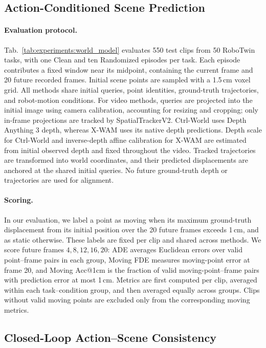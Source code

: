 \subsection{Action-Conditioned Scene Prediction}
\label{app:matched_action}

\paragraph{Evaluation protocol.}
Tab.~\ref{tab:experiments:world_model} evaluates 550 test clips from
50 RoboTwin tasks, with one Clean and ten Randomized episodes per task.
Each episode contributes a fixed window near its midpoint, containing
the current frame and 20 future recorded frames. Initial scene points
are sampled with a 1.5\,cm voxel grid.
All methods share initial queries, point identities, ground-truth
trajectories, and robot-motion conditions.
For video methods, queries are projected into the initial image using camera calibration,
accounting for resizing and cropping; only in-frame projections are
tracked by SpatialTrackerV2. Ctrl-World uses Depth Anything 3 depth,
whereas X-WAM uses its native depth predictions. Depth scale for
Ctrl-World and inverse-depth affine calibration for X-WAM are estimated
from initial observed depth and fixed throughout the video. Tracked
trajectories are transformed into world coordinates, and their predicted
displacements are anchored at the shared initial queries. No future
ground-truth depth or trajectories are used for alignment.

\paragraph{Scoring.}
In our evaluation, we label a point as moving when its maximum
ground-truth displacement from its initial position over the 20 future
frames exceeds 1\,cm, and as static otherwise. These labels are fixed
per clip and shared across methods. We score future frames $4,8,12,16,20$: ADE averages Euclidean
errors over valid point--frame pairs in each group, Moving FDE measures
moving-point error at frame 20, and Moving Acc@1cm is the fraction of
valid moving-point--frame pairs with prediction error at most 1\,cm.
Metrics are first computed per clip, averaged within each task--condition
group, and then averaged equally across groups. Clips without valid
moving points are excluded only from the corresponding moving metrics.

\subsection{Closed-Loop Action--Scene Consistency}
\label{app:future_action_alignment}

